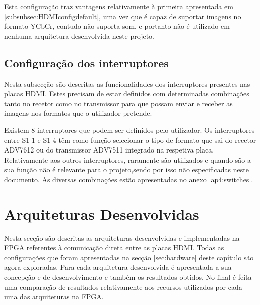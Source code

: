 Esta configuração traz vantagens relativamente à primeira apresentada em \ref{subsubsec:HDMIconfigdefault}, uma vez que é capaz de suportar imagens no formato YCbCr, contudo não suporta som, e portanto não é utilizado em nenhuma arquitetura desenvolvida neste projeto. 


\subsection{Configuração dos interruptores}

Nesta subsecção são descritas as funcionalidades dos interruptores presentes nas placas HDMI. Estes precisam de estar definidos com determinadas combinações tanto no recetor como no transmissor para que possam enviar e receber as imagens nos formatos que o utilizador pretende.

Existem 8 interruptores que podem ser definidos pelo utilizador. Os interruptores entre S1-1 e S1-4 têm como função selecionar o tipo de formato que sai do recetor ADV7612 ou do transmissor ADV7511 integrado na respetiva placa. Relativamente aos outros interruptores, raramente são utilizados e quando são a sua função não é relevante para o projeto,sendo por isso não especificadas neste documento. As diversas combinações estão apresentadas no anexo \ref{ap4:switches}.


\section{Arquiteturas Desenvolvidas} \label{sec:HDMIarquiteturas}

Nesta secção são descritas as arquiteturas desenvolvidas e implementadas na FPGA referentes à comunicação direta entre as placas HDMI. Todas as configurações que foram apresentadas na secção \ref{sec:hardware} deste capítulo são agora exploradas. Para cada arquitetura desenvolvida é apresentada a sua concepção e de desenvolvimento e também os resultados obtidos. No final é feita uma comparação de resultados relativamente aos recursos utilizados por cada uma das arquiteturas na FPGA.


